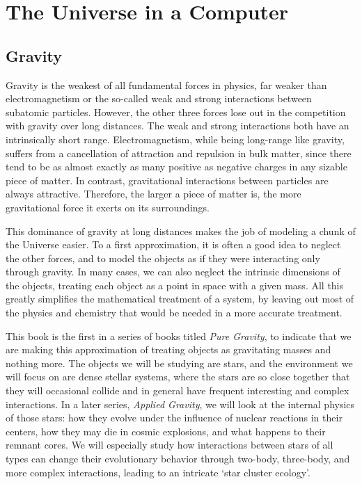 \chapter{The Universe in a Computer}

\section{Gravity}

Gravity is the weakest of all fundamental forces in physics, far
weaker than electromagnetism or the so-called weak and strong
interactions between subatomic particles.  However, the other three
forces lose out in the competition with gravity over long distances.
The weak and strong interactions both have an intrinsically short
range.  Electromagnetism, while being long-range like gravity, suffers
from a cancellation of attraction and repulsion in bulk matter, since
there tend to be as almost exactly as many positive as negative
charges in any sizable piece of matter.  In contrast, gravitational
interactions between particles are always attractive.  Therefore, the
larger a piece of matter is, the more gravitational force it exerts on
its surroundings.

This dominance of gravity at long distances makes the job of
modeling a chunk of the Universe easier.  To a first approximation, it
is often a good idea to neglect the other forces, and to model the
objects as if they were interacting only through gravity.  In many
cases, we can also neglect the intrinsic dimensions of the objects,
treating each object as a point in space with a given mass.  All this
greatly simplifies the mathematical treatment of a system, by leaving
out most of the physics and chemistry that would be needed in a more
accurate treatment.

This book is the first in a series of books titled {\it Pure Gravity}, to
indicate that we are making this approximation of treating objects as
gravitating masses and nothing more.  The objects we will be studying
are stars, and the environment we will focus on are dense stellar
systems, where the stars are so close together that they will
occasional collide and in general have frequent interesting and
complex interactions.  In a later series, {\it Applied Gravity}, we will
look at the internal physics of those stars: how they evolve under the
influence of nuclear reactions in their centers, how they may die in
cosmic explosions, and what happens to their remnant cores.  We will
especially study how interactions between stars of all types can change
their evolutionary behavior through two-body, three-body, and more
complex interactions, leading to an intricate `star cluster ecology'.

